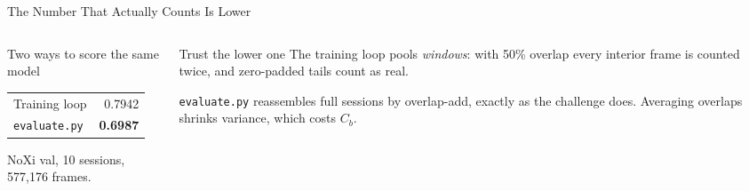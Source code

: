 \documentclass[aspectratio=169]{beamer}
\newcommand{\hl}[1]{\textcolor{coolpurple}{\textbf{#1}}}
\begin{document}
	\begin{frame}{The Number That Actually Counts Is Lower}
		\begin{columns}[onlytextwidth]
			\begin{column}{0.46\textwidth}
				\begin{block}{Two ways to score the same model}
					\small
					\begin{tabular}{lr}
						Training loop & 0.7942 \\
						\texttt{evaluate.py} & \hl{0.6987} \\
					\end{tabular}
					\vspace{0.3em}

					\footnotesize NoXi val, 10 sessions, 577{,}176 frames.
				\end{block}
			\end{column}
			\begin{column}{0.50\textwidth}
				\begin{alertblock}{Trust the lower one}
					\small
					The training loop pools \emph{windows}: with 50\% overlap every interior frame
					is counted twice, and zero-padded tails count as real.
					\vspace{0.2em}

					\texttt{evaluate.py} reassembles full sessions by overlap-add, exactly as the
					challenge does. Averaging overlaps shrinks variance, which costs $C_b$.
				\end{alertblock}
			\end{column}
		\end{columns}
		\vspace{0.4em}
		\begin{center}
		\end{center}
	\end{frame}

\end{document}

